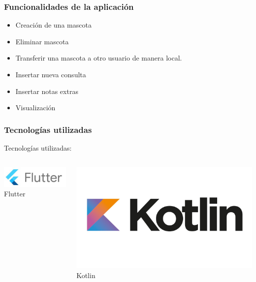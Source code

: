 \documentclass[14pt]{beamer}
\begin{document}
\begin{frame}
\frametitle{Funcionalidades de la aplicación}
\begin{itemize}
\item Creación de una mascota
\item Eliminar mascota
\item Transferir una mascota a otro usuario de manera local.
\item Insertar nueva consulta
\item Insertar notas extras
\item Visualización

\end{itemize}

\end{frame}


\begin{frame}
\frametitle{Tecnologías utilizadas}

Tecnologías utilizadas:



\begin{columns}
\begin{column}{0.3\textwidth}
\begin{center}

\includegraphics[scale =0.45]{Images/LogodeFlutter.jpg}\\
\caption{Flutter}\
\end{center}
\end{column}
\begin{column}{0.3\textwidth}
\begin{center}

\includegraphics[scale =0.10]{Images/LogoKotlin.jpg}\\
\caption{Kotlin}
\end{center}
\end{column}


\end{columns}
\end{frame}
\end{document}
